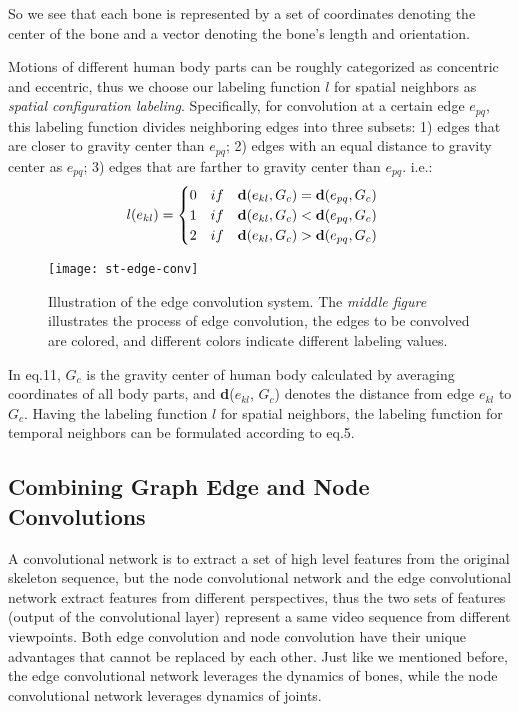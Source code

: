 \documentclass[a4paper,11pt]{article}
\begin{document}
So we see that each bone is represented by a set of coordinates denoting the center of the bone and a vector denoting the bone's length and orientation.

Motions of different human body parts can be roughly categorized as concentric and eccentric, thus we choose our labeling function $l$ for spatial neighbors as {\it spatial configuration labeling}. Specifically, for convolution at a certain edge $e_{pq}$, this labeling function divides neighboring edges into three subsets: 1) edges that are closer to gravity center than $e_{pq}$; 2) edges with an equal distance to gravity center as $e_{pq}$; 3) edges that are farther to gravity center than $e_{pq}$. i.e.:
\begin{equation} l(e_{kl})=
\begin{cases}
0 \quad if \quad {\bf d}(e_{kl}, G_c) = {\bf d}(e_{pq}, G_c)& \\
1 \quad if \quad {\bf d}(e_{kl}, G_c) < {\bf d}(e_{pq}, G_c) & \\
2 \quad if \quad {\bf d}(e_{kl}, G_c) > {\bf d}(e_{pq}, G_c)
\end{cases}
\end{equation}





\begin{figure*}
\centering
\texttt{[image: st-edge-conv]}
\caption{Illustration of the edge convolution system. The {\it middle figure} illustrates the process of edge convolution, the edges to be convolved are colored, and different colors indicate different labeling values.}
\label{fig:example}
\end{figure*}


In eq.11, $G_c$ is the gravity center of human body calculated by averaging coordinates of all body parts, and {\bf d}($e_{kl}$, $G_c$) denotes the distance from edge $e_{kl}$ to $G_c$. Having the labeling function $l$ for spatial neighbors, the labeling function for temporal neighbors can be formulated according to eq.5.

\subsection{Combining Graph Edge and Node Convolutions}

A convolutional network is to extract a set of high level features from the original skeleton sequence, but the node convolutional network and the edge convolutional network extract features from different perspectives, thus the two sets of features (output of the convolutional layer) represent a same video sequence from different viewpoints. Both edge convolution and node convolution have their unique advantages that cannot be replaced by each other. Just like we mentioned before, the edge convolutional network leverages the dynamics of bones, while the node convolutional network leverages dynamics of joints.
\end{document}
